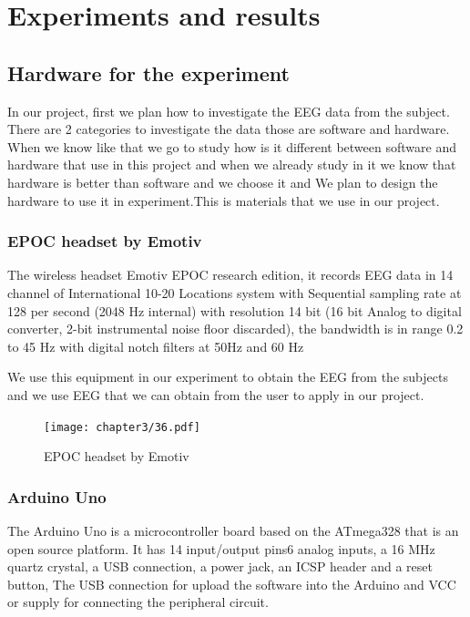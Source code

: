 \chapter{Experiments and results}

\label{ch:Experiments and results}

\setlength{\parindent}{4em}
\setlength{\parskip}{1em}
\renewcommand{\baselinestretch}{1.5}

\section{Hardware for the experiment}

\hspace{1.5cm} In our project, first we plan how to investigate the EEG data from the subject. There are 2 categories to investigate the data those are software and hardware. When we know like that we go to study how is it different between software and hardware that use in this project and when we already study in it we know that hardware is better than software and we choose it and We plan to design the hardware to use it in experiment.This is materials that we use in our project.

\subsection{EPOC headset by Emotiv\texttrademark}
\hspace{1.5cm} The wireless headset Emotiv EPOC research edition, it records EEG data in 14 channel of International 10-20 Locations system with Sequential sampling rate at 128 per second (2048 Hz internal) with resolution 14 bit (16 bit Analog to digital converter, 2-bit instrumental noise floor discarded), the bandwidth is in range 0.2 to 45 Hz with digital notch filters at 50Hz and 60 Hz

We use this equipment in our experiment to obtain the EEG from the subjects and we use EEG that we can obtain from the user to apply in our project.
\begin{figure}[ht]
	\centering
	\texttt{[image: chapter3/36.pdf]}
	\caption{EPOC headset by Emotiv\texttrademark}
\end{figure}

\subsection{Arduino Uno}
\hspace{1.5cm} The Arduino Uno is a microcontroller board based on the ATmega328 that is an open source platform. It has 14 input/output pins6 analog inputs, a 16 MHz quartz crystal, a USB connection, a power jack, an ICSP header and a reset button, The USB connection for upload the software into the Arduino and VCC or supply for connecting the peripheral circuit.

